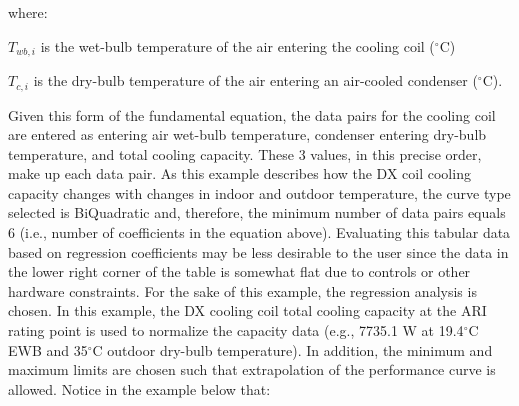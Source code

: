 where:

\(T_{wb,i}\) is the wet-bulb temperature of the air entering the cooling coil (\(^{\circ}\)C)

\(T_{c,i}\) is the dry-bulb temperature of the air entering an air-cooled condenser (\(^{\circ}\)C).

Given this form of the fundamental equation, the data pairs for the cooling coil are entered as entering air wet-bulb temperature, condenser entering dry-bulb temperature, and total cooling capacity. These 3 values, in this precise order, make up each data pair. As this example describes how the DX coil cooling capacity changes with changes in indoor and outdoor temperature, the curve type selected is BiQuadratic and, therefore, the minimum number of data pairs equals 6 (i.e., number of coefficients in the equation above). Evaluating this tabular data based on regression coefficients may be less desirable to the user since the data in the lower right corner of the table is somewhat flat due to controls or other hardware constraints. For the sake of this example, the regression analysis is chosen. In this example, the DX cooling coil total cooling capacity at the ARI rating point is used to normalize the capacity data (e.g., 7735.1 W at 19.4\(^{\circ}\)C EWB and 35\(^{\circ}\)C outdoor dry-bulb temperature). In addition, the minimum and maximum limits are chosen such that extrapolation of the performance curve is allowed. Notice in the example below that:

